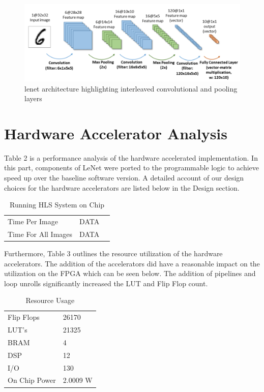 \documentclass[10pt]{article}
\begin{document}
\begin{figure}[H]
\centering
\includegraphics[width=.5\textwidth]{lenet_arch.png}
\caption{lenet architecture highlighting interleaved convolutional and pooling layers}
\end{figure}

\section{Hardware Accelerator Analysis}
Table 2 is a performance analysis of the hardware accelerated implementation. In this part,  components of LeNet were ported to the programmable logic to achieve speed up over the baseline software version.  A detailed account of our design choices for the hardware accelerators are listed below in the Design section. 

\begin{table}[H]
\begin{center}
\caption{Running HLS System on Chip}
\begin{tabular}{lll}
\cline{1-2}
\multicolumn{1}{|l|}{Time Per Image}      & \multicolumn{1}{l|}{DATA} \\ \cline{1-2}
\multicolumn{1}{|l|}{Time For All Images} & \multicolumn{1}{l|}{DATA} \\ \cline{1-2}
\end{tabular}
\end{center}
\end{table} 

Furthermore, Table 3 outlines the resource utilization of the hardware accelerators. The addition of the accelerators did have a reasonable impact on the utilization on the FPGA which can be seen below. The addition of pipelines and loop unrolls significantly increased the LUT and Flip Flop count. 


\begin{table}[H]
\begin{center}
\caption{Resource Usage}
\begin{tabular}{|l|l|}
\cline{1-2}
Flip Flops    & 26170   \\ \cline{1-2}
LUT's         & 21325    \\ \cline{1-2}
BRAM          & 4       \\ \cline{1-2}
DSP           & 12      \\ \cline{1-2}
I/O           & 130     \\ \cline{1-2}
On Chip Power & 2.0009 W \\ \cline{1-2}
\end{tabular}
\end{center}
\end{table}
\end{document}
